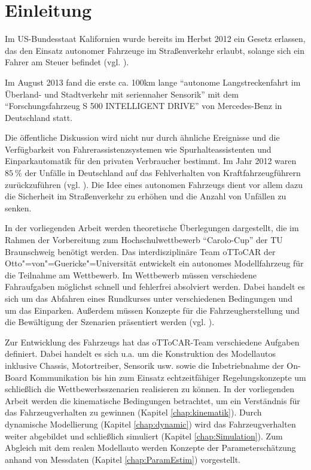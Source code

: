 \chapter{Einleitung}
Im US-Bundesstaat Kalifornien wurde bereits im Herbst 2012 ein Gesetz erlassen, das den Einsatz autonomer Fahrzeuge im Straßenverkehr erlaubt, solange sich ein Fahrer am Steuer befindet (vgl. \cite{Biermann2012}). 

Im August 2013 fand die erste ca. 100km lange "`autonome Langstreckenfahrt im Überland- und Stadtverkehr mit seriennaher Sensorik"' mit dem "`Forschungsfahrzeug S 500 INTELLIGENT DRIVE"' \cite{Daimler2013} von Mercedes-Benz in Deutschland statt. 

Die öffentliche Diskussion wird nicht nur durch ähnliche Ereignisse und die Verfügbarkeit von Fahrerassistenzsystemen wie Spurhalteassistenten und Einparkautomatik für den privaten Verbraucher bestimmt. Im Jahr 2012 waren $\SI{85}{\percent}$ der Unfälle in Deutschland auf das Fehlverhalten von Kraftfahrzeugführern zurückzuführen (vgl. \cite{destatis2013}). Die Idee eines autonomen Fahrzeugs dient vor allem dazu die Sicherheit im Straßenverkehr zu erhöhen und die Anzahl von Unfällen zu senken. 

In der vorliegenden Arbeit werden theoretische Überlegungen dargestellt, die im Rahmen der Vorbereitung zum Hochschulwettbewerb "`Carolo-Cup"' der TU Braunschweig benötigt werden.
Das interdisziplinäre Team oTToCAR der Otto"=von"=Guericke"=Universität entwickelt ein autonomes Modellfahrzeug für die Teilnahme am Wettbewerb.
Im Wettbewerb müssen verschiedene Fahraufgaben möglichst schnell und fehlerfrei absolviert werden. Dabei handelt es sich um das Abfahren eines Rundkurses unter verschiedenen Bedingungen und um das Einparken. Außerdem müssen Konzepte für die Fahrzeugherstellung und die Bewältigung der Szenarien präsentiert werden (vgl. \cite{carolo2014}).

Zur Entwicklung des Fahrzeugs hat das oTToCAR-Team verschiedene Aufgaben definiert. Dabei handelt es sich u.a. um die Konstruktion des Modellautos inklusive Chassis, Motortreiber, Sensorik usw. sowie die Inbetriebnahme der On-Board Kommunikation bis hin zum Einsatz echtzeitfähiger Regelungskonzepte um schließlich die Wettbewerbsszenarien realisieren zu können.
In der vorliegenden Arbeit werden die kinematische Bedingungen betrachtet, um ein Verständnis für das Fahrzeugverhalten zu gewinnen (Kapitel \ref{chap:kinematik}). Durch dynamische Modellierung (Kapitel \ref{chap:dynamic}) wird das Fahrzeugverhalten weiter abgebildet und schließlich simuliert (Kapitel \ref{chap:Simulation}). Zum Abgleich mit dem realen Modellauto werden Konzepte der Parameterschätzung anhand von Messdaten (Kapitel \ref{chap:ParamEstim}) vorgestellt.



